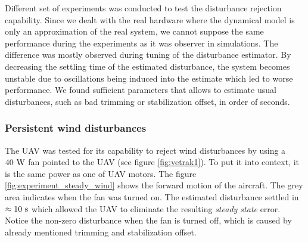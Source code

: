 Different set of experiments was conducted to test the disturbance rejection capability. Since we dealt with the real hardware where the dynamical model is only an approximation of the real system, we cannot suppose the same performance during the experiments as it was observer in simulations. The difference was mostly observed during tuning of the disturbance estimator. By decreasing the settling time of the estimated disturbance, the system becomes unstable due to oscillations being induced into the estimate which led to worse performance. We found sufficient parameters that allows to estimate usual disturbances, such as bad trimming or stabilization offset, in order of seconds.
 
\subsubsection{Persistent wind disturbances}
\label{cap:persistant_wind_disturbances_experiment}

The UAV was tested for its capability to reject wind disturbances by using a $40~\mathrm{W}$ fan pointed to the UAV (see figure \ref{fig:vetrak1}). To put it into context, it is the same power as one of UAV motors. The figure \ref{fig:experiment_steady_wind} shows the forward motion of the aircraft. The grey area indicates when the fan was turned on. The estimated disturbance settled in $\approx 10~\mathrm{s}$ which allowed the UAV to eliminate the resulting \emph{steady state} error. Notice the non-zero disturbance when the fan is turned off, which is caused by already mentioned trimming and stabilization offset.

